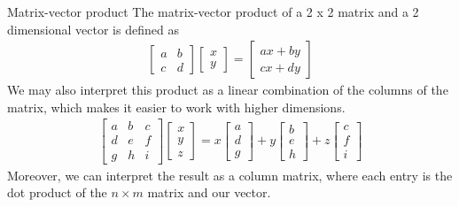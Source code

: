 \documentclass[11pt]{article}
\begin{document}
\begin{definitionbox}{Matrix-vector product}
    The matrix-vector product of a 2 x 2 matrix and a 2 dimensional vector is defined as
    \begin{align*}
        \begin{bmatrix}
            a & b \\
            c & d
        \end{bmatrix}
        \begin{bmatrix}
            x \\
            y
        \end{bmatrix}
        =
        \begin{bmatrix}
            ax+by \\
            cx+dy
        \end{bmatrix}
    \end{align*}
    We may also interpret this product as a linear combination of the columns of the matrix, which makes it easier to work with higher dimensions.
    \begin{align*}
        \begin{bmatrix}
            a & b & c \\
            d & e & f \\
            g & h & i
        \end{bmatrix}
        \begin{bmatrix}
            x \\
            y \\
            z
        \end{bmatrix}
        =
        x
        \begin{bmatrix}
            a \\
            d \\
            g
        \end{bmatrix}
        +
        y
        \begin{bmatrix}
            b \\
            e \\
            h
        \end{bmatrix}
        +
        z
        \begin{bmatrix}
            c \\
            f \\
            i
        \end{bmatrix}
    \end{align*}
    Moreover, we can interpret the result as a column matrix, where each entry is the dot product of the $n \times m$ matrix and our vector.
\end{definitionbox}
\end{document}
